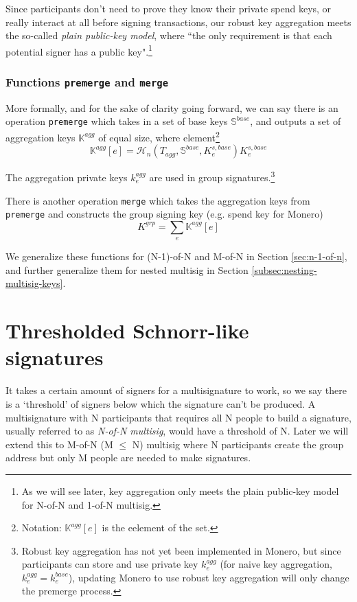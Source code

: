 Since participants don't need to prove they know their private spend keys, or really interact at all before signing transactions, our robust key aggregation meets the so-called {\em plain public-key model}, where ``the only requirement is that each potential signer has a public key"\cite{maxwell2018simple-musig}.\footnote{As we will see later, key aggregation only meets the plain public-key model for N-of-N and 1-of-N multisig.}

\subsubsection*{Functions {\tt premerge} and {\tt merge}}

More formally, and for the sake of clarity going forward, we can say there is an operation {\tt premerge} which takes in a set of base keys $\mathbb{S}^{base}$, and outputs a set of aggregation keys $\mathbb{K}^{agg}$ of equal size, where element\footnote{Notation: $\mathbb{K}^{agg}[e]$ is the e\nth element of the set.}
\[\mathbb{K}^{agg}[e] = \mathcal{H}_n(T_{agg},\mathbb{S}^{base},K^{s,base}_e)K^{s,base}_e\]

The aggregation private keys $k^{agg}_e$ are used in group signatures.\footnote{Robust key aggregation has not yet been implemented in Monero, but since participants can store and use private key $k^{agg}_e$ (for naive key aggregation, $k^{agg}_e = k^{base}_e$), updating Monero to use robust key aggregation will only change the premerge process.}

There is another operation {\tt merge} which takes the aggregation keys from {\tt premerge} and constructs the group signing key (e.g. spend key for Monero)\vspace{.175cm}
\[K^{grp} = \sum_e \mathbb{K}^{agg}[e]\]

We generalize these functions for (N-1)-of-N and M-of-N in Section \ref{sec:n-1-of-n}, and further generalize them for nested multisig in Section \ref{subsec:nesting-multisig-keys}.



\section{Thresholded Schnorr-like signatures}
\label{sec:threshold-schnorr}

It takes a certain amount of signers for a multisignature to work, so we say there is a `threshold' of signers below which the signature can't be produced. A multisignature with N participants that requires all N people to build a signature, usually referred to as {\em N-of-N multisig}, would have a threshold of N. Later we will extend this to M-of-N (M $\leq$ N) multisig where N participants create the group address but only M people are needed to make signatures.

